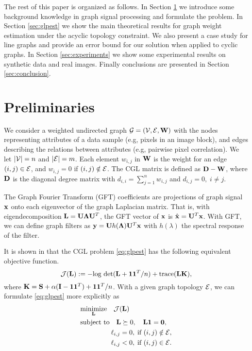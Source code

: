 \documentclass{article}
\begin{document}
The rest of this paper is organized as follows. In Section \ref{sec:preliminaries} we introduce some background knowledge in graph signal processing and formulate the problem. In Section \ref{sec:glpest} we show the main theoretical results for graph weight estimation under the acyclic topology constraint. We also present a case study for line graphs and provide an error bound for our solution when applied to cyclic graphs. In Section \ref{sec:experiments} we show some experimental results on synthetic data and real images. Finally conclusions are presented in Section \ref{sec:conclusion}. 


\section{Preliminaries}
\label{sec:preliminaries}
We consider a weighted undirected graph ${\cal G}=({\cal V},{\cal E},{\bf W})$ with the nodes representing attributes of a data sample (e.g, pixels in an image block), and edges describing the relations between attributes (e.g, pairwise pixel correlation). We let $|{\cal V}|=n$ and $|{\cal E}|=m$. Each element $w_{i,j}$ in ${\bf W}$ is the weight for an edge $(i,j)\in{\cal E}$, and $w_{i,j}=0$ if $(i,j)\notin{\cal E}$. The CGL matrix is defined as ${\bf D}-{\bf W}$, where ${\bf D}$ is the diagonal degree matrix with $d_{i,i}=\sum_{j=1}^n w_{i,j}$ and $d_{i,j}=0,\; i\neq j$. 

The Graph Fourier Transform (GFT) coefficients are projections of graph signal ${\bf x}$ onto each eigenvector of the graph Laplacian matrix. That is, with eigendecomposition ${\bf L}={\bf U}\hbox{\boldmath$\Lambda$}{\bf U}^T$, the GFT vector of ${\bf x}$ is $\hat{{\bf x}}={\bf U}^T{\bf x}$. With GFT, we can define graph filters as ${\bf y}={\bf U} h(\hbox{\boldmath$\Lambda$}){\bf U}^T{\bf x}$ with $h(\lambda)$ the spectral response of the filter. 

It is shown in \cite{Egilmez2017} that the CGL problem \eqref{eq:glpest} has the following equivalent objective function.
\begin{equation}
\label{eq:objfunc_cgl}
  {\cal J}({\bf L}) := -\text{log det}({\bf L}+{\bf 1}{\bf 1}^T/n)+\text{trace}({\bf L}{\bf K}),
\end{equation}
where ${\bf K}={\bf S}+\alpha({\bf I}-{\bf 1}{\bf 1}^T)+{\bf 1}{\bf 1}^T/n$. 
With a given graph topology ${\cal E}$, we can formulate \eqref{eq:glpest} more explicitly as
\begin{align}
\label{eq:prob_cgl}
  & \underset{{\bf L}}{\text{minimize}} \quad {\cal J}({\bf L}) \nonumber\\
  & \text{subject to} \quad {\bf L}\succeq 0, \quad {\bf L}{\bf 1}={\bf 0}, \nonumber\\
  & \hspace{1.6cm} \ell_{i,j}=0,\;\text{if }(i,j)\notin{\cal E}, \nonumber\\
  & \hspace{1.6cm} \ell_{i,j}<0,\;\text{if }(i,j)\in{\cal E}.
\end{align}
\end{document}
